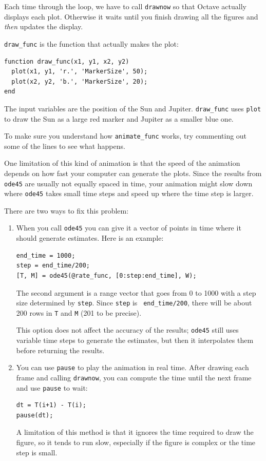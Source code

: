 \documentclass{book}
\begin{document}
Each time through the loop, we have to call {\tt drawnow} so
that Octave actually displays each plot. Otherwise it waits
until you finish drawing all the figures and {\em then} updates
the display.

{\tt draw\_func} is the function that actually makes the
plot:

\begin{verbatim}
function draw_func(x1, y1, x2, y2)
  plot(x1, y1, 'r.', 'MarkerSize', 50);
  plot(x2, y2, 'b.', 'MarkerSize', 20);
end
\end{verbatim}

The input variables are the position of the Sun and Jupiter.
{\tt draw\_func} uses {\tt plot} to draw
the Sun as a large red marker and Jupiter as a smaller blue one.

\begin{ex}
To make sure you understand how {\tt animate\_func} works,
try commenting out some of the lines to see what happens.
\end{ex}

One limitation of this kind of animation is that the speed
of the animation depends on how fast your computer can generate
the plots. Since the results from {\tt ode45} are usually not
equally spaced in time, your animation might slow down where
{\tt ode45} takes small time steps and speed up where the time
step is larger.

There are two ways to fix this problem:

\begin{enumerate}

\item When you call {\tt ode45} you can give it a vector of
points in time where it should generate estimates. Here is
an example:

\begin{verbatim}
end_time = 1000;
step = end_time/200;
[T, M] = ode45(@rate_func, [0:step:end_time], W);
\end{verbatim}

The second argument is a range vector that goes from 0 to 1000 with a
step size determined by {\tt step}. Since {\tt step} is {\tt
end\_time/200}, there will be about 200 rows in {\tt T} and {\tt M}
(201 to be precise).

This option does not affect the accuracy of the results; {\tt ode45}
still uses variable time steps to generate the estimates, but then it
interpolates them before returning the results.

\item You can use {\tt pause} to play the animation in
real time. After drawing each frame and calling
{\tt drawnow}, you can compute the time
until the next frame and use {\tt pause} to wait:

\begin{verbatim}
dt = T(i+1) - T(i);
pause(dt);
\end{verbatim}

A limitation of this method is that it ignores the time required to
draw the figure, so it tends to run slow, especially if the figure is
complex or the time step is small.

\end{enumerate}
\end{document}
